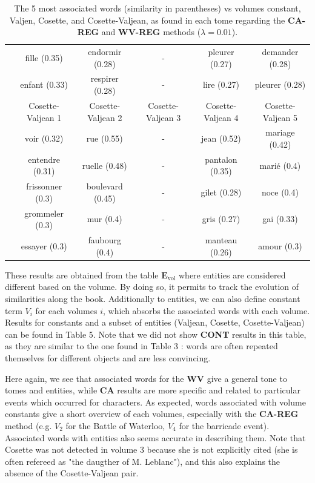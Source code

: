 \documentclass[
twocolumn,
]{ceurart}
\begin{document}
\begin{table}[!h]
\begin{tabular}{|c|c|c|c|c|c|}
		& fille (0.35) & endormir (0.28) & - & pleurer (0.27) & demander (0.28) \\
		& enfant (0.33) & respirer (0.28) & - & lire (0.27) & pleurer (0.28) \\
		\cline{2-6}
		& Cosette-Valjean 1 & Cosette-Valjean 2 & Cosette-Valjean 3 & Cosette-Valjean 4 & Cosette-Valjean 5 \\
		\cline{2-6}
		& voir (0.32) & rue (0.55) & - & jean (0.52) & mariage (0.42) \\ 
		& entendre (0.31) & ruelle (0.48) & - & pantalon (0.35) & marié (0.4) \\ 
		& frissonner (0.3) & boulevard (0.45) & - & gilet (0.28) & noce (0.4) \\ 
		& grommeler (0.3) & mur (0.4) & - & gris (0.27) & gai (0.33) \\ 
		& essayer (0.3) & faubourg (0.4) & - & manteau (0.26) & amour (0.3) \\ 
		\hline
	\end{tabular}
	\label{TIME_REG_word_vs_obj}
	\caption{The 5 most associated words (similarity in parentheses) vs volumes constant, Valjen, Cosette, and Cosette-Valjean, as found in each tome regarding the \textbf{CA-REG} and \textbf{WV-REG} methods ($\lambda = 0.01$).}
\end{table}

These results are obtained from the table $\mathbf{E}_\text{vol}$ where entities are considered different based on the volume. By doing so, it permits to track the evolution of similarities along the book. Additionally to entities, we can also define constant term $V_i$ for each volumes $i$, which absorbs the associated words with each volume. Results for constants and a subset of entities (Valjean, Cosette, Cosette-Valjean) can be found in Table 5. Note that we did not show \textbf{CONT} results in this table, as they are similar to the one found in Table 3 : words are often repeated themselves for different objects and are less convincing. 

Here again, we see that associated words for the \textbf{WV} give a general tone to tomes and entities, while \textbf{CA} results are more specific and related to particular events which occurred for characters. As expected, words associated with volume constants give a short overview of each volumes, especially with the \textbf{CA-REG} method (e.g. $V_2$ for the Battle of Waterloo, $V_4$ for the barricade event). Associated words with entities also seems accurate in describing them. Note that Cosette was not detected in volume 3 because she is not explicitly cited (she is often refereed as "the daugther of M. Leblanc"), and this also explains the absence of the Cosette-Valjean pair. 
\end{document}

